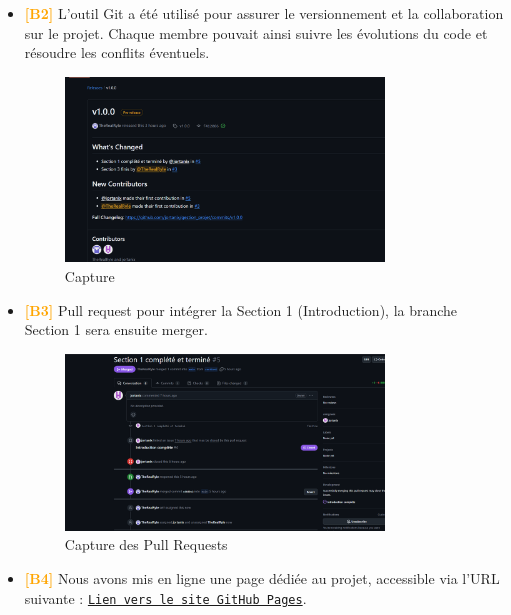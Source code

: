 \begin{itemize}
    \item \textbf{\textcolor{orange}{[B2]}} L’outil Git a été utilisé pour assurer le versionnement et la collaboration sur le projet. Chaque membre pouvait ainsi suivre les évolutions du code et résoudre les conflits éventuels.
    \begin{figure}[H]
    \centering
    \includegraphics[width=0.8\textwidth]{Images/B2.png}
    \caption{Capture}
    \label{fig:imageB2}
    \end{figure}
    
    \item \textbf{\textcolor{orange}{[B3]}} Pull request pour intégrer la Section 1 (Introduction), la branche Section 1 sera ensuite merger.
    \begin{figure}[H]
    \centering
    \includegraphics[width=0.8\textwidth]{Images/B3.png}
    \caption{Capture des Pull Requests}
    \label{fig:imageB3}
    \end{figure}
    
    \item \textbf{\textcolor{orange}{[B4]}} Nous avons mis en ligne une page dédiée au projet, accessible via l’URL suivante : \href{https://jortanix.github.io/gestion_projet/}{\texttt{Lien vers le site GitHub Pages}}.


\end{itemize}
